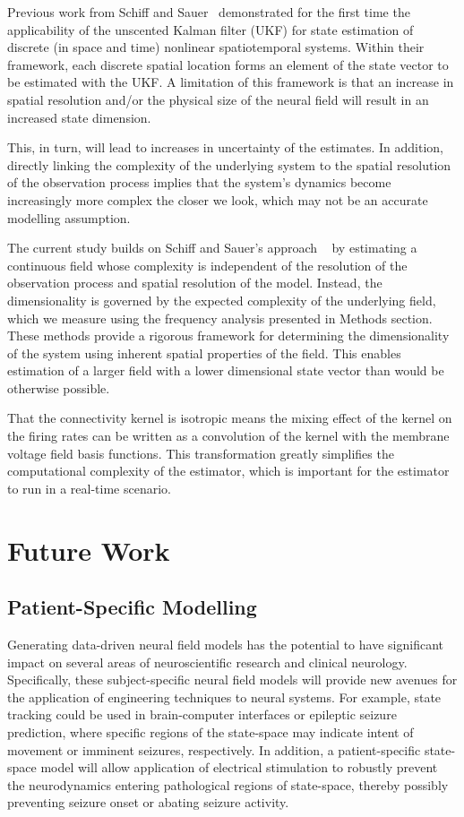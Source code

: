 \documentclass[12pt]{iopart}
\begin{document}
Previous work from Schiff and Sauer~\cite{schiff2008kalman} demonstrated for the first time the applicability of the unscented Kalman filter (UKF) for state estimation of discrete (in space and time) nonlinear spatiotemporal systems. Within their framework, each discrete spatial location forms an element of the state vector to be estimated with the UKF. A limitation of this framework is that an increase in spatial resolution and/or the physical size of the neural field will result in an increased state dimension. 

This, in turn, will lead to increases in uncertainty of the estimates. In addition, directly linking the complexity of the underlying system to the spatial resolution of the observation process implies that the system's dynamics become increasingly more complex the closer we look, which may not be an accurate modelling assumption.

The current study builds on Schiff and Sauer's approach ~\cite{schiff2008kalman} by estimating a continuous field whose complexity is independent of the resolution of the observation process and spatial resolution of the model. Instead, the dimensionality is governed by the expected complexity of the underlying field, which we measure using the frequency analysis presented in Methods section. These methods provide a rigorous framework for determining the dimensionality of the system using inherent spatial properties of the field. This enables estimation of a larger field with a lower dimensional state vector than would be otherwise possible. 

That the connectivity kernel is isotropic means the mixing effect of the kernel on the firing rates can be written as a convolution of the kernel with the membrane voltage field basis functions. This transformation greatly simplifies the computational complexity of the estimator, which is important for the estimator to run in a real-time scenario.


\section{Future Work}

\subsection{Patient-Specific Modelling}

Generating data-driven neural field models has the potential to have significant impact on several areas of neuroscientific research and clinical neurology. Specifically, these subject-specific neural field models will provide new avenues for the application of engineering techniques to neural systems. For example, state tracking could be used in brain-computer interfaces or epileptic seizure prediction, where specific regions of the state-space may indicate intent of movement or imminent seizures, respectively. In addition, a patient-specific state-space model will allow application of electrical stimulation to robustly prevent the neurodynamics entering pathological regions of state-space, thereby possibly preventing seizure onset or abating seizure activity.
\end{document}
